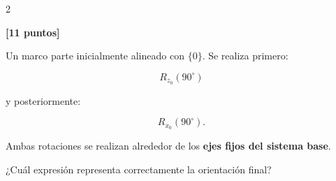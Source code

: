 \documentclass[10pt]{article}
\begin{document}
\begin{multicols}{2}
\begin{question}
\begin{answers}
                \answer{
                    \[
                    \mathbf{p}_A
                    =
                    \begin{bmatrix}
                        -1\\0\\0
                    \end{bmatrix},
                    \qquad
                    \mathbf{p}_B
                    =
                    \begin{bmatrix}
                        0\\0\\1
                    \end{bmatrix}
                    \]
                }

            \end{answers}
        \end{question}
            \columnbreak



        \begin{question}
            \textbf{[11 puntos]}

            Un marco parte inicialmente alineado con \(\{0\}\).
            Se realiza primero:

            \[
            R_{z_0}(90^\circ)
            \]

            y posteriormente:

            \[
            R_{x_0}(90^\circ).
            \]

            Ambas rotaciones se realizan alrededor de los
            \textbf{ejes fijos del sistema base}.

            ¿Cuál expresión representa correctamente la orientación final?


\end{question}
\end{multicols}
\end{document}
